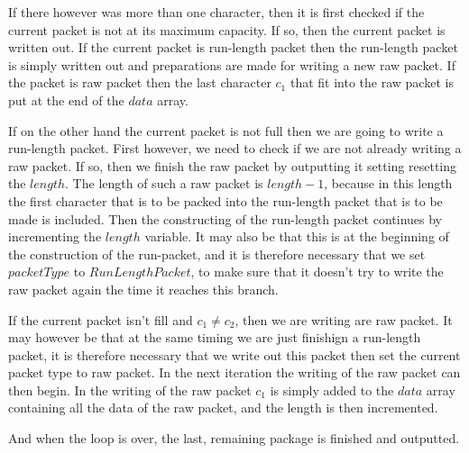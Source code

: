If there however was more than one character, then it is first checked
if the current packet is not at its maximum capacity. If so, then the
current packet is written out. If the current packet is run-length
packet then the run-length packet is simply written out and
preparations are made for writing a new raw packet. If the packet is
raw packet then the last character $c_1$ that fit into the raw packet is put
at the end of the $data$ array.

If on the other hand the current packet is not full then we are going
to write a run-length packet. First however, we need to check if we
are not already writing a raw packet. If so, then we finish the raw
packet by outputting it setting resetting the $length$. The length of
such a raw packet is $length - 1$, because in this length the
first character that is to be packed into the run-length packet that is to
be made is included.  Then the constructing of the run-length packet
continues by incrementing the $length$ variable. It may also be that
this is at the beginning of the construction of the run-packet, and it
is therefore necessary that we set  $packetType$ to $RunLengthPacket$,
to make sure that it doesn't try to write the raw packet again the
time it reaches this branch.

If the current packet isn't fill and $c_1 \neq c_2$,  then we are
writing are raw packet. It may however be that at the same timing we
are just finishign a run-length packet, it is therefore necessary that
we write out this packet then set the current packet type to raw
packet. In the next iteration the writing of the raw packet can then
begin. In the writing of the raw packet $c_1$ is simply added to the
$data$ array containing all the data of the raw packet, and the length
is then incremented.

And when the loop is over, the last, remaining package is finished and
outputted.


